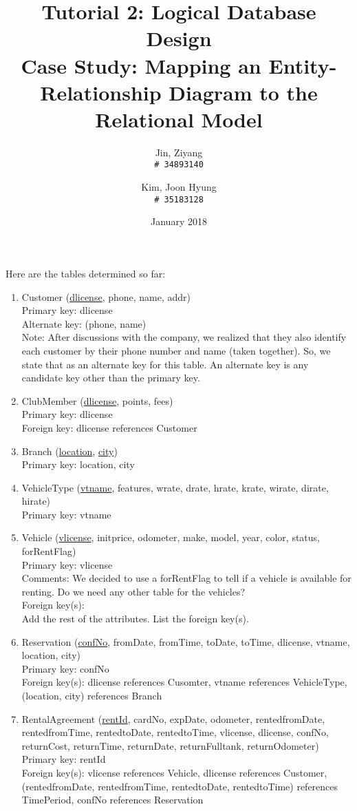 \documentclass{article}
\title{%
	Tutorial 2: Logical Database Design \\
	\large Case Study: Mapping an Entity-Relationship Diagram to the Relational Model}
\author{
	Jin, Ziyang\\
	\texttt{\# 34893140}
	\and
	Kim, Joon Hyung\\
	\texttt{\# 35183128}
}
\date{January 2018}
\begin{document}
	\maketitle
	Here are the tables determined so far:
	\begin{enumerate}
		\item Customer (\underline{dlicense}, phone, name, addr) \\ 
			Primary key: dlicense \\ 
			Alternate key: (phone, name)\\ 
			Note: After discussions with the company, we realized that they also identify each customer by their 				phone number and name (taken together). So, we state that as an alternate key for this table. An 				alternate key is any candidate key other than the primary key.
		\item ClubMember (\underline{dlicense}, points, fees)\\
			Primary key: dlicense \\
			Foreign key: dlicense references Customer
		\item Branch (\underline{location}, \underline{city}) \\
			Primary key: location, city
		\item VehicleType (\underline{vtname}, features, wrate, drate, hrate, krate, wirate, dirate, hirate) \\
			Primary key: vtname
		
		\item Vehicle (\underline{vlicense}, initprice, odometer, make, model, year, color, status, forRentFlag) \\
			Primary key: vlicense \\
			Comments: We decided to use a forRentFlag to tell if a vehicle is available for renting. Do we
					need any other table for the vehicles? \\
			Foreign key(s): \\
			Add the rest of the attributes. List the foreign key(s).
			
		\item Reservation (\underline{confNo}, fromDate, fromTime, toDate, toTime, dlicense, vtname, location, city)\\
			Primary key: confNo \\
			Foreign key(s): dlicense references Cusomter, vtname references VehicleType, (location, city) references Branch
		
		\item RentalAgreement (\underline{rentId}, cardNo, expDate, odometer, rentedfromDate, rentedfromTime,
			rentedtoDate, rentedtoTime, vlicense, dlicense, confNo, returnCost, returnTime, returnDate, returnFulltank, returnOdometer) \\
			Primary key: rentId \\
			Foreign key(s): vlicense references Vehicle, dlicense references Customer, (rentedfromDate, rentedfromTime, rentedtoDate, rentedtoTime) references TimePeriod, confNo references Reservation
				

\end{enumerate}
\end{document}

